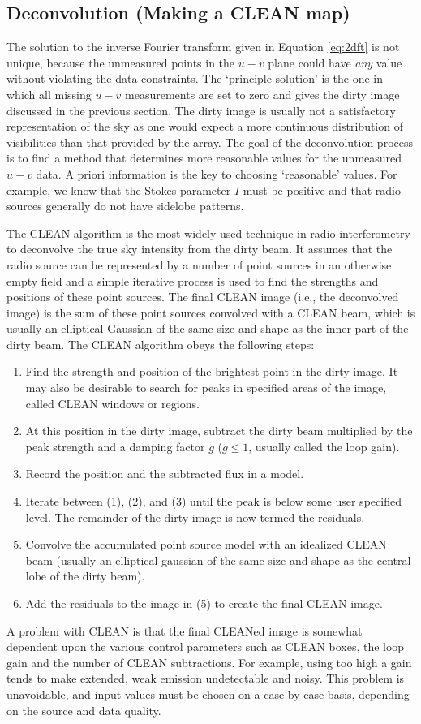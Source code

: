 \subsection{Deconvolution (Making a CLEAN map)}\label{subsec:4.3}
The solution to the inverse Fourier transform given in Equation \ref{eq:2dft}
 is not unique, because the unmeasured points in the $u-v$ plane could have \textit{any} value without violating the data constraints. The `principle solution' is the one in which all missing $u-v$ measurements are set to zero and gives the dirty image discussed in the previous section. The dirty image is usually not a satisfactory representation of the sky as one would expect a more continuous distribution of visibilities than that provided by the array. The goal of the deconvolution process is to find a method that determines more reasonable values for the unmeasured $u-v$ data. A priori information is the key to choosing `reasonable' values. For example, we know that the Stokes parameter $I$ must be positive and that radio sources generally do not have sidelobe patterns.
 
The CLEAN algorithm \citep{hogbom_1974} is the most widely used technique in radio interferometry to deconvolve the true sky intensity from the dirty beam. It assumes that the radio source can be represented by a number of point sources in an otherwise empty field and a simple iterative process is used to find the strengths and positions of these point sources. The final CLEAN image (i.e., the deconvolved image) is the sum of these point sources convolved with a CLEAN beam, which is usually an elliptical Gaussian of the same size and shape as the inner part of the dirty beam. The CLEAN algorithm obeys the following steps:
\begin{enumerate}
\item Find the strength and position of the brightest point in the dirty image. It may also be desirable to search for peaks in specified areas of the image, called CLEAN windows or regions.
\item At this position in the dirty image, subtract the dirty beam multiplied by the peak strength and a damping factor $g$ ($g \le 1$, usually called the loop gain).
\item Record the position and the subtracted flux in a model.
\item Iterate between (1), (2), and (3) until the peak is below some user specified level. The remainder of the dirty image is now  termed the residuals.
\item Convolve the accumulated point source model with an idealized CLEAN beam (usually an elliptical gaussian of the same size and shape as the central lobe of the dirty beam).
\item Add the residuals to the image in (5) to create the final CLEAN image.
\end{enumerate}
A problem with CLEAN is that the final CLEANed image is somewhat dependent upon the various control parameters such as CLEAN boxes, the loop gain and the number of CLEAN subtractions. For example, using too high a gain tends to make extended, weak emission undetectable and noisy. This problem is unavoidable, and input values must be chosen on a case by case basis, depending on the source and data quality.

